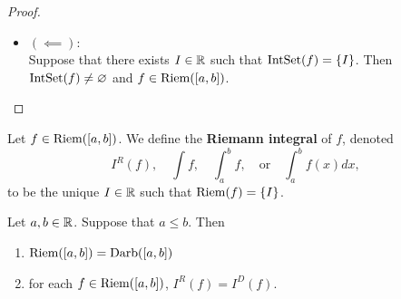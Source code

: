 \documentclass{book}
\begin{document}
\begin{proof}
\begin{itemize}
\begin{itemize}
				\begin{align*}
					\{I\}
					& \subset \IntSet(f) \\
					& \subset \{I\}.
				\end{align*}
				Therefore $\IntSet(f) = \{I\}$. 
			\end{itemize}
			\item $(\impliedby)$: \\
			Suppose that there exists $I \in \mathbb{R}$ such that $\IntSet(f) = \{I\}$. Then $\text{IntSet}(f) \neq \varnothing$ and $f \in \text{Riem}([a,b])$. 
		\end{itemize}
	\end{proof}
	
	\begin{defn}
		Let $f \in \text{Riem}([a,b])$. We define the \textbf{Riemann integral} of $f$, denoted
		$$I^R(f), \quad \int f, \quad  \int_a^b f, \quad \text{or} \quad \int_a^b f(x) dx,$$  
		to be the unique $I \in \mathbb{R}$ such that $\text{Riem}(f) = \{I\}$.
	\end{defn}
	
	\begin{ex}
		
	\end{ex}
	
	\begin{ex}
		Let $a,b \in \mathbb{R}$. Suppose that $a \leq b$. Then 
		\begin{enumerate}
			\item $\text{Riem}([a,b]) = \text{Darb}([a,b])$
			\item for each $f \in \text{Riem}([a,b])$, $I^R(f) = I^D(f)$. 
		\end{enumerate}
	\end{ex}
	
\end{document}
